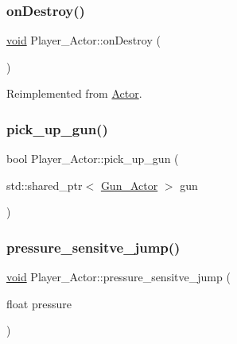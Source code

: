 \mbox{\label{classPlayer__Actor_a200b6b956d9c597cbc626ca9bcafb25e}} 
\subsubsection{\texorpdfstring{on\+Destroy()}{onDestroy()}}
{\footnotesize\ttfamily \hyperlink{imgui__impl__opengl3__loader_8h_ac668e7cffd9e2e9cfee428b9b2f34fa7}{void} Player\+\_\+\+Actor\+::on\+Destroy (\begin{DoxyParamCaption}{ }\end{DoxyParamCaption})\hspace{0.3cm}{\ttfamily [virtual]}}



Reimplemented from \hyperlink{classActor_a47101d6275509662bf6c84c3f3439696}{Actor}.

\mbox{\label{classPlayer__Actor_a3ad2a23796a81a6167b1c44f068bc754}} 
\subsubsection{\texorpdfstring{pick\+\_\+up\+\_\+gun()}{pick\_up\_gun()}}
{\footnotesize\ttfamily bool Player\+\_\+\+Actor\+::pick\+\_\+up\+\_\+gun (\begin{DoxyParamCaption}\item[{std\+::shared\+\_\+ptr$<$ \hyperlink{classGun__Actor}{Gun\+\_\+\+Actor} $>$}]{gun }\end{DoxyParamCaption})}

\mbox{\label{classPlayer__Actor_a7bf2cb158a0d6fefb3e4818142046654}} 
\subsubsection{\texorpdfstring{pressure\+\_\+sensitve\+\_\+jump()}{pressure\_sensitve\_jump()}}
{\footnotesize\ttfamily \hyperlink{imgui__impl__opengl3__loader_8h_ac668e7cffd9e2e9cfee428b9b2f34fa7}{void} Player\+\_\+\+Actor\+::pressure\+\_\+sensitve\+\_\+jump (\begin{DoxyParamCaption}\item[{float}]{pressure }\end{DoxyParamCaption})}

